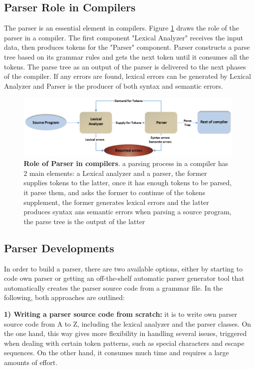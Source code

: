 \subsection{Parser Role in Compilers}
The parser is an essential element in  compilers. {Figure \ref{Fig:parserPosition}} draws the role of the parser in a compiler. The first component "Lexical Analyzer" receives the input data, then produces tokens for  the "Parser" component. Parser constructs a parse tree based on its grammar rules and gets the next token until it consumes all the tokens. The parse tree as an output of the parser is delivered to the next phases of the compiler. If any errors are found, lexical errors can be generated by Lexical Analyzer and Parser is the producer of both syntax and semantic errors. 

\begin{figure}[ht]
	\begin{center}	\setlength\belowcaptionskip{-5mm}
	\includegraphics[scale=0.55,angle=0]{images/ParserRole}
	\caption{\textbf{Role of Parser in compilers}. a parsing process in a compiler has 2 main elements: a Lexical analyzer and a parser, the former supplies tokens to the latter, once it has enough tokens to be parsed, it parse them, and asks the former to continue of the tokens supplement, the former generates lexical errors and the latter produces syntax ans semantic errors when parsing a source program, the parse tree is the output of the latter }
		\label{Fig:parserPosition}
	\end{center}
\end{figure}
\subsection{Parser Developments}
In order to build a parser, there are two available options, either by starting  to code own parser  or getting an off-the-shelf automatic parser generator tool that automatically creates the parser source code from a grammar file. In the following, both approaches are outlined:

\textbf{1) Writing a parser source code from scratch:} it is to write own parser source code from A to Z, including the lexical analyzer and the parser classes. On the one hand, this way gives more flexibility in handling several issues, triggered when dealing with certain token patterns, such as special characters and escape sequences. On the other hand, it consumes much time and requires a large amounts of  effort.

